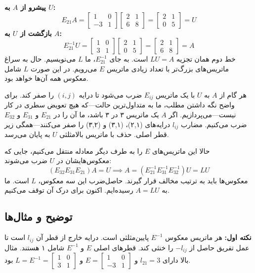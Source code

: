 \documentclass[12pt, a4paper]{book}
\begin{document}
	\textbf{پیشرو از $A$ به $U$:}
	\[ E_{21}A = \begin{bmatrix} 1 & 0 \\ -3 & 1 \end{bmatrix} \begin{bmatrix} 2 & 1 \\ 6 & 8 \end{bmatrix} = \begin{bmatrix} 2 & 1 \\ 0 & 5 \end{bmatrix} = U \]
	\textbf{بازگشت از $U$ به $A$:}
	\[ E_{21}^{-1}U = \begin{bmatrix} 1 & 0 \\ 3 & 1 \end{bmatrix} \begin{bmatrix} 2 & 1 \\ 0 & 5 \end{bmatrix} = \begin{bmatrix} 2 & 1 \\ 6 & 8 \end{bmatrix} = A \]
	خط دوم همان تجزیه $LU=A$ است. به جای $E_{21}^{-1}$، ما $L$ می‌نویسیم. حال به سراغ ماتریس‌های بزرگ‌تر با تعداد زیادی ماتریس $E$ می‌رویم. در این صورت $L$ شامل معکوس همه آن‌ها خواهد بود.
	
	هر گام از $A$ به $U$ با یک ماتریس $E_{ij}$ ضرب می‌شود تا درایه $(i,j)$ را صفر کند. برای واضح نگه داشتن مطلب، ما به متداول‌ترین حالت—که هیچ تعویض سطری در کار نیست—می‌پردازیم. اگر $A$ یک ماتریس ۳ در ۳ باشد، ما آن را در $E_{21}$ و $E_{31}$ و $E_{32}$ ضرب می‌کنیم. مضارب $l_{ij}$ درایه‌های (۲,۱)، (۳,۱) و (۳,۲) را صفر می‌کنند—همگی زیر قطر اصلی. حذف با ماتریس بالامثلثی $U$ به پایان می‌رسد.
	
	حالا این ماتریس‌های $E$ را به طرف دیگر معادله منتقل می‌کنیم، جایی که معکوس‌هایشان در $U$ ضرب می‌شوند:
	\[ (E_{32}E_{31}E_{21})A=U \implies A = (E_{21}^{-1}E_{31}^{-1}E_{32}^{-1})U = LU \]
	معکوس‌ها باید به ترتیب مخالف قرار گیرند. حاصل‌ضرب این سه معکوس، $L$ است. ما به $A=LU$ رسیده‌ایم. اکنون برای درک آن توقف می‌کنیم.
	
	\subsection*{توضیح و مثال‌ها}
	\textbf{نکته اول:} هر ماتریس معکوس $E^{-1}$ پایین‌مثلثی است. درایه خارج از قطر آن $l_{ij}$ است تا عمل تفریق حاصل از $-l_{ij}$ را خنثی کند. قطرهای اصلی $E$ و $E^{-1}$ شامل ۱ هستند.
	مثال بالا دارای $l_{21}=3$ و $E = \begin{bmatrix} 1 & 0 \\ -3 & 1 \end{bmatrix}$ و $L = E^{-1} = \begin{bmatrix} 1 & 0 \\ 3 & 1 \end{bmatrix}$ بود.
	
\end{document}
